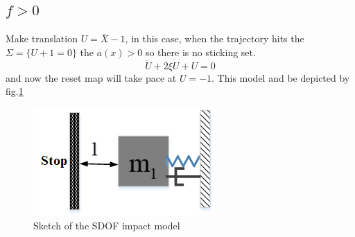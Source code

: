 \documentclass[a4paper,10pt]{article}
\begin{document}
	\subsection{$f>0$}
	Make translation $U=\bar X-1$, in this case, when the trajectory hits the $\Sigma=\{ U+1=0\}$ the $a(x)>0$ so there is no sticking set.
	\begin{equation}
	\ddot U+2\xi \dot U+U=0
	\label{eq:generalized 1dof equation}
	\end{equation}
	and now the reset map will take pace at $U=-1$. This model and be depicted by fig.\ref{fig:SDof Model}
	\begin{figure}[htpb]
		\centering
		\includegraphics[width= 0.5 \textwidth]{BEB_Explanation/figures/SDOF_model.png}
		\caption{Sketch of the SDOF impact model}
		\label{fig:SDof Model}
	\end{figure}
	
\end{document}
